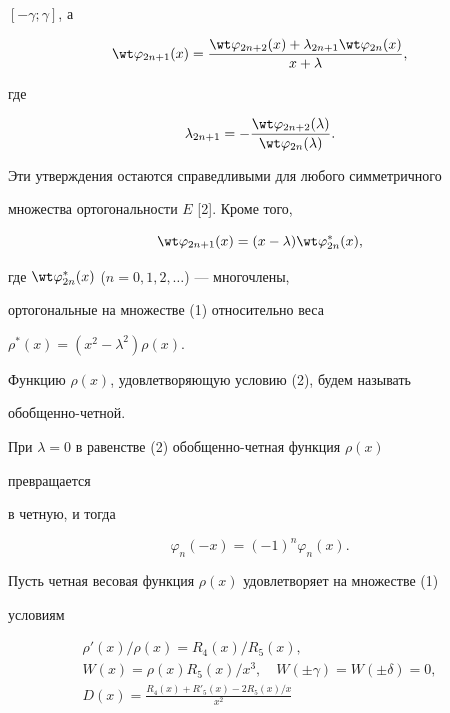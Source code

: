 $[-\gamma;\gamma]$, а 


\begin{equation} 


\wt\varphi_{2n+1}(x)= 


\frac{\wt\varphi_{2n+2}(x)+\lambda_{2n+1}\wt\varphi_{2n}(x)}{x+\lambda}, 


\end{equation} 


где 


\begin{equation} 


\lambda_{2n+1}=-\frac{\wt\varphi_{2n+2}(\lambda)} 


{\wt\varphi_{2n}(\lambda)}. 


\end{equation} 


Эти утверждения остаются справедливыми для любого симметричного 


множества ортогональности $E$ [2]. Кроме того, 


\begin{equation} 


\wt\varphi_{2n+1}(x)=(x-\lambda)\wt\varphi^*_{2n}(x), 


\end{equation} 


где $\wt\varphi^*_{2n}(x)$ ($n=0,1,2,\dotsc$) --- многочлены, 


ортогональные на множестве (1) относительно веса 


$\rho^*(x)=(x^2-\lambda^2)\rho(x)$. 


 


Функцию $\rho(x)$, удовлетворяющую условию (2), будем называть 


обобщенно-четной. 


При $\lambda=0$ в равенстве (2) обобщенно-четная функция $\rho(x)$ 


превращается 


в четную, и тогда


$$


\varphi_n(-x)=(-1)^n\varphi_n(x). 


$$


 


Пусть четная весовая функция $\rho(x)$ удовлетворяет на множестве (1) 


условиям 


\begin{gather} 


\rho'(x)/\rho(x)=R_4(x)/R_5(x),\\ 


W(x)=\rho(x)R_5(x)/x^3,\quad 


W(\pm\gamma)=W(\pm\delta)=0,\\ 


D(x)=\frac{R_4(x)+R'_5(x)-2R_5(x)/x}{x^2} 


\end{gather} 


